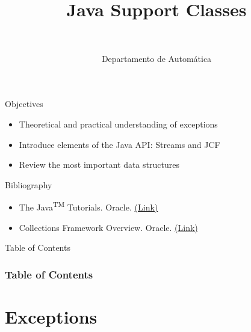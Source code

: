 \documentclass[10pt,compress]{beamer} %
\title[Java Support Classes]{Java Support Classes}
\author{\asignatura\\\carrera}
\institute{}
\date{Departamento de Automática}
\begin{document}
{\titlepageBlue
    \begin{frame}
        \titlepage
    \end{frame}
}

\begin{frame}[plain]{}
   \begin{block}{Objectives}
      \begin{itemize}
	\item Theoretical and practical understanding of exceptions
	\item Introduce elements of the Java API: Streams and JCF
        \item Review the most important data structures
      \end{itemize} 
   \end{block}

   \begin{block}{Bibliography}
      \begin{itemize}
          \item The Java\textsuperscript{TM} Tutorials. Oracle. \href{https://docs.oracle.com/javase/tutorial/}{(Link)}
          \item Collections Framework Overview. Oracle. \href{http://docs.oracle.com/javase/7/docs/technotes/guides/collections/overview.html}{(Link)}
      \end{itemize} 
   \end{block}
\end{frame}

{
\begin{frame}[shrink]{Table of Contents}
 \frametitle{Table of Contents}
 \tableofcontents
\end{frame}
}

\section{Exceptions}
\end{document}
